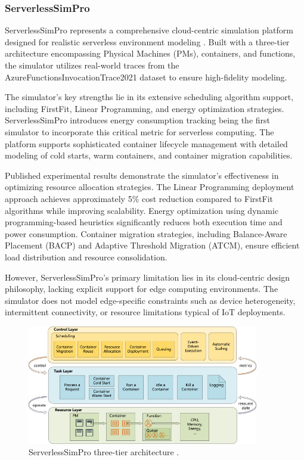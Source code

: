 \subsubsection{ServerlessSimPro}

ServerlessSimPro represents a comprehensive cloud-centric simulation platform designed for realistic serverless environment modeling \cite{das2022serverlesssimpro}. Built with a three-tier architecture encompassing Physical Machines (PMs), containers, and functions, the simulator utilizes real-world traces from the AzureFunctionsInvocationTrace2021 dataset to ensure high-fidelity modeling.

The simulator's key strengths lie in its extensive scheduling algorithm support, including FirstFit, Linear Programming, and energy optimization strategies. ServerlessSimPro introduces energy consumption tracking being the first simulator to incorporate this critical metric for serverless computing. The platform supports sophisticated container lifecycle management with detailed modeling of cold starts, warm containers, and container migration capabilities.

Published experimental results demonstrate the simulator's effectiveness in optimizing resource allocation strategies. The Linear Programming deployment approach achieves approximately 5\% cost reduction compared to FirstFit algorithms while improving scalability. Energy optimization using dynamic programming-based heuristics significantly reduces both execution time and power consumption. Container migration strategies, including Balance-Aware Placement (BACP) and Adaptive Threshold Migration (ATCM), ensure efficient load distribution and resource consolidation.

However, ServerlessSimPro's primary limitation lies in its cloud-centric design philosophy, lacking explicit support for edge computing environments. The simulator does not model edge-specific constraints such as device heterogeneity, intermittent connectivity, or resource limitations typical of IoT deployments.


\begin{figure}[htbp]
\centering
\includegraphics[width=0.9\textwidth]{assets/serverlesssimproArch.jpg}
\caption{ServerlessSimPro three-tier architecture \cite{das2022serverlesssimpro}.}
\label{fig:serverlesssimpro-architecture}
\end{figure}

